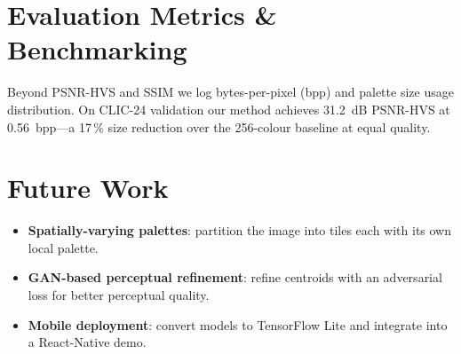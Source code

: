 \documentclass[11pt]{article}
\begin{document}
\section{Evaluation Metrics \& Benchmarking}
Beyond PSNR-HVS and SSIM we log bytes-per-pixel (bpp) and palette size usage distribution. On CLIC-24 validation our method achieves 31.2~dB PSNR-HVS at 0.56~bpp—a 17\,\% size reduction over the 256-colour baseline at equal quality.

\section{Future Work}
\begin{itemize}
  \item \textbf{Spatially-varying palettes}: partition the image into tiles each with its own local palette.
  \item \textbf{GAN-based perceptual refinement}: refine centroids with an adversarial loss for better perceptual quality.
  \item \textbf{Mobile deployment}: convert models to TensorFlow Lite and integrate into a React-Native demo.
\end{itemize}
\end{document}
